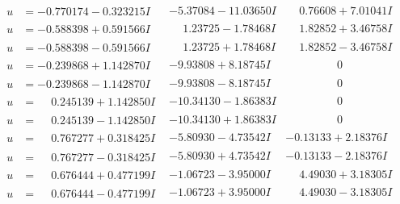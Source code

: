 \documentclass[1p]{elsarticle_modified}
\theoremstyle{definition}
\begin{document}
$$\begin{array}{c|c|c}
\begin{aligned}
u &= -0.770174 - 0.323215 I\end{aligned}
 & -5.37084 - 11.03650 I & \phantom{-}0.76608 + 7.01041 I \\ \hline\begin{aligned}
u &= -0.588398 + 0.591566 I\end{aligned}
 & \phantom{-}1.23725 - 1.78468 I & \phantom{-}1.82852 + 3.46758 I \\ \hline\begin{aligned}
u &= -0.588398 - 0.591566 I\end{aligned}
 & \phantom{-}1.23725 + 1.78468 I & \phantom{-}1.82852 - 3.46758 I \\ \hline\begin{aligned}
u &= -0.239868 + 1.142870 I\end{aligned}
 & -9.93808 + 8.18745 I & \phantom{-0.000000 } 0 \\ \hline\begin{aligned}
u &= -0.239868 - 1.142870 I\end{aligned}
 & -9.93808 - 8.18745 I & \phantom{-0.000000 } 0 \\ \hline\begin{aligned}
u &= \phantom{-}0.245139 + 1.142850 I\end{aligned}
 & -10.34130 - 1.86383 I & \phantom{-0.000000 } 0 \\ \hline\begin{aligned}
u &= \phantom{-}0.245139 - 1.142850 I\end{aligned}
 & -10.34130 + 1.86383 I & \phantom{-0.000000 } 0 \\ \hline\begin{aligned}
u &= \phantom{-}0.767277 + 0.318425 I\end{aligned}
 & -5.80930 - 4.73542 I & -0.13133 + 2.18376 I \\ \hline\begin{aligned}
u &= \phantom{-}0.767277 - 0.318425 I\end{aligned}
 & -5.80930 + 4.73542 I & -0.13133 - 2.18376 I \\ \hline\begin{aligned}
u &= \phantom{-}0.676444 + 0.477199 I\end{aligned}
 & -1.06723 - 3.95000 I & \phantom{-}4.49030 + 3.18305 I \\ \hline\begin{aligned}
u &= \phantom{-}0.676444 - 0.477199 I\end{aligned}
 & -1.06723 + 3.95000 I & \phantom{-}4.49030 - 3.18305 I \\ \hline\begin{aligned}

\end{aligned}
\end{array}$$
\end{document}
